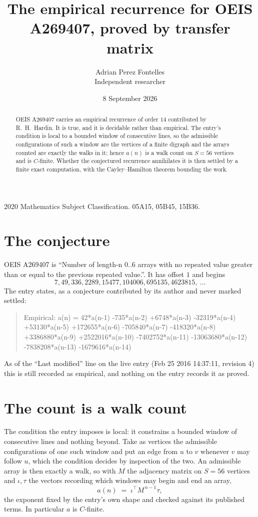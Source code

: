 \documentclass[11pt,a4paper]{article}
\title{The empirical recurrence for OEIS A269407, proved by transfer matrix}
\author{Adrian Perez Fontelles\\ \small Independent researcher}
\date{8 September 2026}
\theoremstyle{plain}
\theoremstyle{definition}
\begin{document}
\maketitle

\begin{abstract}
OEIS A269407 carries an empirical recurrence of order $14$ contributed by R.~H.~Hardin. It is
true, and it is decidable rather than empirical. The entry's condition is local to a bounded window of consecutive lines, so
the admissible configurations of such a window are the vertices of a finite digraph and the
arrays counted are exactly the walks in it; hence $a(n)$ is a walk count on $S=56$ vertices
and is $C$-finite. Whether the conjectured recurrence annihilates it is then settled by a
finite exact computation, with the Cayley--Hamilton theorem bounding the work.
\end{abstract}

\noindent\small 2020 Mathematics Subject Classification. 05A15, 05B45, 15B36.\normalsize

\section{The conjecture}

OEIS A269407 is ``Number of length-n 0..6 arrays with no repeated value greater than or equal to the previous repeated value.''. It has offset $1$ and begins
\[
7, 49, 336, 2289, 15477, 104006, 695135, 4623815,\ \dots
\]
The entry states, as a conjecture contributed by its author and never marked settled:
\begin{quote}
Empirical: a(n) = 42*a(n-1) -735*a(n-2) +6748*a(n-3) -32319*a(n-4) +53130*a(n-5) +172655*a(n-6) -705840*a(n-7) -418320*a(n-8) +3386880*a(n-9) +2522016*a(n-10) -7402752*a(n-11) -13063680*a(n-12) -7838208*a(n-13) -1679616*a(n-14)
\end{quote}
As of the ``Last modified'' line on the live entry (Feb 25 2016 14:37:11, revision 4) this is still
recorded as empirical, and nothing on the entry records it as proved.

\section{The count is a walk count}

The condition the entry imposes is local: it constrains a bounded window of consecutive lines and nothing beyond. Take as
vertices the admissible configurations of one such window and put an edge from $u$ to $v$
whenever $v$ may follow $u$, which the condition decides by inspection of the two. An
admissible array is then exactly a walk, so with $M$ the adjacency matrix on $S=56$ vertices
and $\iota,\tau$ the vectors recording which windows may begin and end an array,
\[
a(n)\;=\;\iota^{\!\top}M^{\,n-1}\tau ,
\]
the exponent fixed by the entry's own shape and checked against its published terms. In
particular $a$ is $C$-finite.
\end{document}
